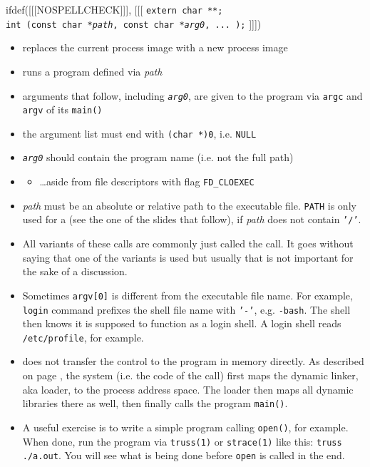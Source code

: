 \begin{slide}
ifdef([[[NOSPELLCHECK]]], [[[
\texttt{extern char **;\\
int (const char *\emph{path}, const char *\emph{arg0}, ... );}
]]])
\begin{itemize}
\item replaces the current process image with a new process image
\item runs a program defined via \emph{path}
\item arguments that follow, including \emph{\texttt{arg0}}, are given to the
program via \texttt{argc} and \texttt{argv} of its \texttt{main()}
\item the argument list must end with \texttt{(char *)0}, i.e. \texttt{NULL}
\item \emph{\texttt{arg0}} should contain the program name (i.e. not the full
path)
\item {}
\begin{itemize}
\item \dots{}aside from file descriptors with flag \texttt{FD\_CLOEXEC}
\end{itemize}
\end{itemize}
\end{slide}

\label{EXEC}

\begin{itemize}
\item \emph{path} must be an absolute or relative path to the executable file.
\texttt{PATH} is only used for  a  (see the one of
the slides that follow), if \emph{path} does not contain \texttt{'/'}.
\item All variants of these calls are commonly just called the 
call.  It goes without saying that one of the variants is used but usually that
is not important for the sake of a discussion.
\item Sometimes \texttt{argv[0]} is different from the executable file name.
For example, \texttt{login} command prefixes the shell file name with
\texttt{'-'}, e.g. \texttt{-bash}.  The shell then knows it is supposed to
function as a login shell.  A login shell reads \texttt{/etc/profile}, for
example.
\item {} does not transfer the control to the program in memory
directly. As described on page \pageref{RUNTIMELINKER}, the system (i.e. the
code of the  call) first maps the dynamic linker, aka loader, to the
process address space.  The loader then maps all dynamic libraries there as
well, then finally calls the program \texttt{main()}.
\item A useful exercise is to write a simple program calling \texttt{open()},
for example.  When done, run the program via \texttt{truss(1)} or
\texttt{strace(1)} like this: \texttt{truss ./a.out}. You will see what is being
done before \texttt{open} is called in the end.
\end{itemize}

